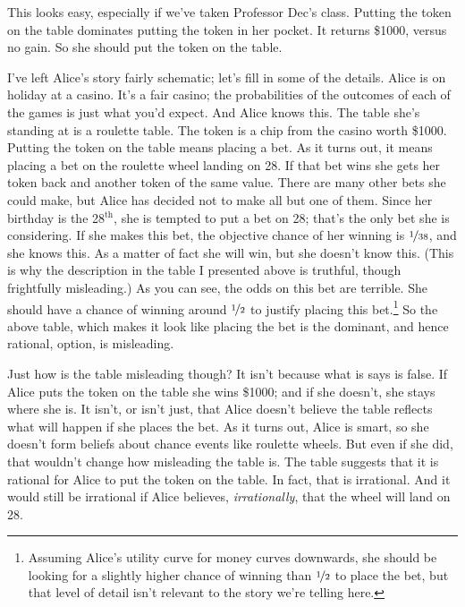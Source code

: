 \noindent This looks easy, especially if we've taken Professor Dec's class. Putting the token on the table dominates putting the token in her pocket. It returns \$1000, versus no gain. So she should put the token on the table.

I've left Alice's story fairly schematic; let's fill in some of the details. Alice is on holiday at a casino. It's a fair casino; the probabilities of the outcomes of each of the games is just what you'd expect. And Alice knows this. The table she's standing at is a roulette table. The token is a chip from the casino worth \$1000. Putting the token on the table means placing a bet. As it turns out, it means placing a bet on the roulette wheel landing on 28. If that bet wins she gets her token back and another token of the same value. There are many other bets she could make, but Alice has decided not to make all but one of them. Since her birthday is the 28$^{\text{th}}$, she is tempted to put a bet on 28; that's the only bet she is considering. If she makes this bet, the objective chance of her winning is $\nicefrac{1}{38}$, and she knows this. As a matter of fact she will win, but she doesn't know this. (This is why the description in the table I presented above is truthful, though frightfully misleading.) As you can see, the odds on this bet are terrible. She should have a chance of winning around $\nicefrac{1}{2}$ to justify placing this bet.\footnote{Assuming Alice's utility curve for money curves downwards, she should be looking for a slightly higher chance of winning than $\nicefrac{1}{2}$ to place the bet, but that level of detail isn't relevant to the story we're telling here.} So the above table, which makes it look like placing the bet is the dominant, and hence rational, option, is misleading.

Just how is the table misleading though? It isn't because what is says is false. If Alice puts the token on the table she wins \$1000; and if she doesn't, she stays where she is. It isn't, or isn't just, that Alice doesn't believe the table reflects what will happen if she places the bet. As it turns out, Alice is smart, so she doesn't form beliefs about chance events like roulette wheels. But even if she did, that wouldn't change how misleading the table is. The table suggests that it is rational for Alice to put the token on the table. In fact, that is irrational. And it would still be irrational if Alice believes, \textit{irrationally}, that the wheel will land on 28.

